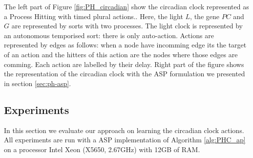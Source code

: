 The left part of Figure \ref{fig:PH_circadian} show the circadian clock represented as a Process Hitting with timed plural actions..
Here, the light $L$, the gene $PC$ and $G$ are represented by sorts with two processes.
The light clock is represented by an autonomous temporised sort: there is only auto-action.
Actions are represented by edges as follows: when a node have incomming edge its the target of an action and the hitters of this action are the nodes where those edges are comming.
Each action are labelled by their delay.
Right part of the figure shows the representation of the circadian clock with the ASP formulation we presented in section \ref{sec:ph-asp}.

\subsection{Experiments}

In this section we evaluate our approach on learning the circadian clock actions.
All experiments are run with a ASP implementation of Algorithm \ref{alg:PHC_ap} on a processor Intel Xeon (X5650, 2.67GHz) with 12GB of RAM.

